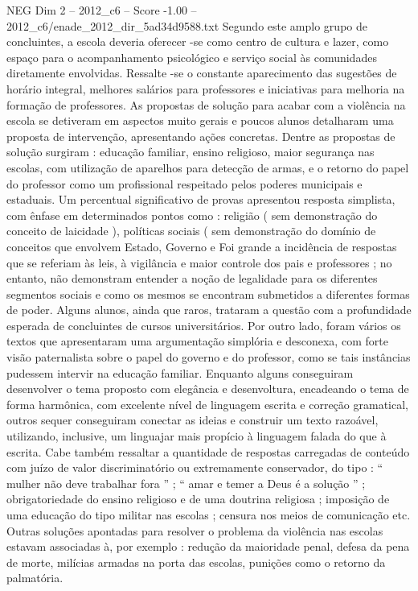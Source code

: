 \begin{textsample}{NEG Dim 2 – 2012\_c6 – Score -1.00 – 2012\_c6/enade\_2012\_dir\_5ad34d9588.txt}
Segundo este amplo grupo de concluintes, a escola deveria oferecer -se como centro de cultura e lazer, como espaço para o acompanhamento psicológico e serviço social às comunidades diretamente envolvidas.
Ressalte -se o constante aparecimento das sugestões de horário integral, melhores salários para professores e iniciativas para melhoria na formação de professores.
As propostas de solução para acabar com a violência na escola se detiveram em aspectos muito gerais e poucos alunos detalharam uma proposta de intervenção, apresentando ações concretas.
Dentre as propostas de solução surgiram : educação familiar, ensino religioso, maior segurança nas escolas, com utilização de aparelhos para detecção de armas, e o retorno do papel do professor como um profissional respeitado pelos poderes municipais e estaduais.
Um percentual significativo de provas apresentou resposta simplista, com ênfase em determinados pontos como : religião ( sem demonstração do conceito de laicidade ), políticas sociais ( sem demonstração do domínio de conceitos que envolvem Estado, Governo e Foi grande a incidência de respostas que se referiam às leis, à vigilância e maior controle dos pais e professores ; no entanto, não demonstram entender a noção de legalidade para os diferentes segmentos sociais e como os mesmos se encontram submetidos a diferentes formas de poder.
Alguns alunos, ainda que raros, trataram a questão com a profundidade esperada de concluintes de cursos universitários.
Por outro lado, foram vários os textos que apresentaram uma argumentação simplória e desconexa, com forte visão paternalista sobre o papel do governo e do professor, como se tais instâncias pudessem intervir na educação familiar.
Enquanto alguns conseguiram desenvolver o tema proposto com elegância e desenvoltura, encadeando o tema de forma harmônica, com excelente nível de linguagem escrita e correção gramatical, outros sequer conseguiram conectar as ideias e construir um texto razoável, utilizando, inclusive, um linguajar mais propício à linguagem falada do que à escrita.
Cabe também ressaltar a quantidade de respostas carregadas de conteúdo com juízo de valor discriminatório ou extremamente conservador, do tipo : “ mulher não deve trabalhar fora ” ; “ amar e temer a Deus é a solução ” ; obrigatoriedade do ensino religioso e de uma doutrina religiosa ; imposição de uma educação do tipo militar nas escolas ; censura nos meios de comunicação etc.
Outras soluções apontadas para resolver o problema da violência nas escolas estavam associadas à, por exemplo : redução da maioridade penal, defesa da pena de morte, milícias armadas na porta das escolas, punições como o retorno da palmatória.

\end{textsample}
